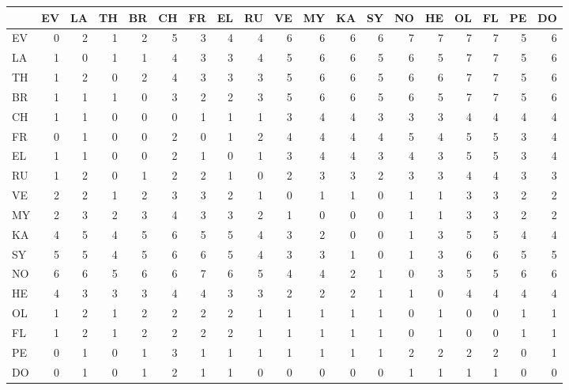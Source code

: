 
\begin{tabular}[t]{l|r|r|r|r|r|r|r|r|r|r|r|r|r|r|r|r|r|r}
\hline
  & EV & LA & TH & BR & CH & FR & EL & RU & VE & MY & KA & SY & NO & HE & OL & FL & PE & DO\\
\hline
EV & 0 & 2 & 1 & 2 & 5 & 3 & 4 & 4 & 6 & 6 & 6 & 6 & 7 & 7 & 7 & 7 & 5 & 6\\
\hline
LA & 1 & 0 & 1 & 1 & 4 & 3 & 3 & 4 & 5 & 6 & 6 & 5 & 6 & 5 & 7 & 7 & 5 & 6\\
\hline
TH & 1 & 2 & 0 & 2 & 4 & 3 & 3 & 3 & 5 & 6 & 6 & 5 & 6 & 6 & 7 & 7 & 5 & 6\\
\hline
BR & 1 & 1 & 1 & 0 & 3 & 2 & 2 & 3 & 5 & 6 & 6 & 5 & 6 & 5 & 7 & 7 & 5 & 6\\
\hline
CH & 1 & 1 & 0 & 0 & 0 & 1 & 1 & 1 & 3 & 4 & 4 & 3 & 3 & 3 & 4 & 4 & 4 & 4\\
\hline
FR & 0 & 1 & 0 & 0 & 2 & 0 & 1 & 2 & 4 & 4 & 4 & 4 & 5 & 4 & 5 & 5 & 3 & 4\\
\hline
EL & 1 & 1 & 0 & 0 & 2 & 1 & 0 & 1 & 3 & 4 & 4 & 3 & 4 & 3 & 5 & 5 & 3 & 4\\
\hline
RU & 1 & 2 & 0 & 1 & 2 & 2 & 1 & 0 & 2 & 3 & 3 & 2 & 3 & 3 & 4 & 4 & 3 & 3\\
\hline
VE & 2 & 2 & 1 & 2 & 3 & 3 & 2 & 1 & 0 & 1 & 1 & 0 & 1 & 1 & 3 & 3 & 2 & 2\\
\hline
MY & 2 & 3 & 2 & 3 & 4 & 3 & 3 & 2 & 1 & 0 & 0 & 0 & 1 & 1 & 3 & 3 & 2 & 2\\
\hline
KA & 4 & 5 & 4 & 5 & 6 & 5 & 5 & 4 & 3 & 2 & 0 & 0 & 1 & 3 & 5 & 5 & 4 & 4\\
\hline
SY & 5 & 5 & 4 & 5 & 6 & 6 & 5 & 4 & 3 & 3 & 1 & 0 & 1 & 3 & 6 & 6 & 5 & 5\\
\hline
NO & 6 & 6 & 5 & 6 & 6 & 7 & 6 & 5 & 4 & 4 & 2 & 1 & 0 & 3 & 5 & 5 & 6 & 6\\
\hline
HE & 4 & 3 & 3 & 3 & 4 & 4 & 3 & 3 & 2 & 2 & 2 & 1 & 1 & 0 & 4 & 4 & 4 & 4\\
\hline
OL & 1 & 2 & 1 & 2 & 2 & 2 & 2 & 1 & 1 & 1 & 1 & 1 & 0 & 1 & 0 & 0 & 1 & 1\\
\hline
FL & 1 & 2 & 1 & 2 & 2 & 2 & 2 & 1 & 1 & 1 & 1 & 1 & 0 & 1 & 0 & 0 & 1 & 1\\
\hline
PE & 0 & 1 & 0 & 1 & 3 & 1 & 1 & 1 & 1 & 1 & 1 & 1 & 2 & 2 & 2 & 2 & 0 & 1\\
\hline
DO & 0 & 1 & 0 & 1 & 2 & 1 & 1 & 0 & 0 & 0 & 0 & 0 & 1 & 1 & 1 & 1 & 0 & 0\\
\hline
\end{tabular}
